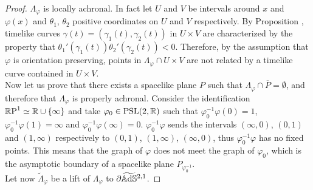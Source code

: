 \begin{proof}
    $\Lambda_\varphi$ is locally achronal. In fact let $U$ and $V$ be intervals around $x$ and $\varphi(x)$ and $\theta_1$, $\theta_2$ positive coordinates on $U$ and $V$ respectively. By Proposition , timelike curves $\gamma(t)=(\gamma_1(t),\gamma_2(t))$ in $U\times V$ are characterized by the property that $\theta_1'(\gamma_1(t))\theta_2'(\gamma_2(t)) < 0$. Therefore, by the assumption that $\varphi$ is orientation preserving, points in $\Lambda_\varphi \cap U\times V$ are not related by a timelike curve contained in $U \times V$.\\
    Now let us prove that there exists a spacelike plane $P$ such that $\Lambda_\varphi \cap \overline{P} = \emptyset$, and therefore that $\Lambda_\varphi$ is properly achronal. Consider the identification $\mathbb{R}\textup{P}^1 \simeq \mathbb{R} \cup \{ \infty \}$ and take $\varphi_0 \in \text{PSL}(2,\mathbb{R})$ such that $\varphi_0^{-1} \varphi (0) = 1$, $\varphi_0^{-1} \varphi (1) = \infty$ and $\varphi_0^{-1} \varphi (\infty) = 0$. $\varphi_0^{-1} \varphi$ sends the intervals $(\infty, 0)$, $(0,1)$ and $(1,\infty)$ respectively to $(0,1)$, $(1,\infty)$, $(\infty, 0)$, thus $\varphi_0^{-1} \varphi$ has no fixed points. This means that the graph of $\varphi$ does not meet the graph of $\varphi_0$, which is the asymptotic boundary of a spacelike plane $P_{\varphi_0^{-1}}$.\\
    Let now $\widetilde{\Lambda}_\varphi$ be a lift of $\Lambda_{\varphi}$ to $\partial\widetilde{\mathbb{A}\mathrm{d}\mathbb{S}}{}^{2,1}$. 
\end{proof}




